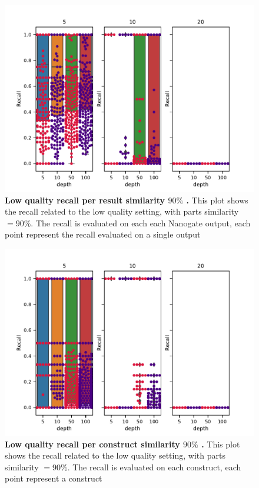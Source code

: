 \documentclass[11pt, a4paper]{article}
\begin{document}
 \begin{figure}[ht]
    \begin{center}
    \includegraphics[width=1.35\textwidth]{../results/images_notebook/v_460/lq_sim_90_recall_per_result.pdf}
    \end{center}
    \caption{{\bf Low quality recall per result similarity $90\%$ .}  This plot shows the recall related to the low quality setting, with parts similarity $=90\%$. The recall is evaluated on each each Nanogate output, each point represent the recall evaluated on a single output}
   \label{fig:v_460_lq_sim_90_recall_per_result}
\end{figure}

 \begin{figure}[ht]
    \begin{center}
    \includegraphics[width=1.35\textwidth]{../results/images_notebook/v_460/lq_sim_90_recall_per_construct.pdf}
    \end{center}
    \caption{{\bf Low quality recall per construct similarity $90\%$ .}  This plot shows the recall related to the low quality setting, with parts similarity $=90\%$. The recall is evaluated on each construct, each point represent a construct}
   \label{fig:v_460_lq_sim_90_recall_per_construct}
\end{figure}
\end{document}
